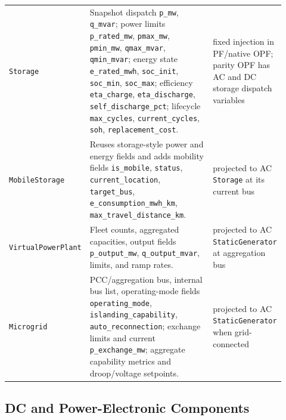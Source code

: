\begin{longtable}{L{0.20\linewidth}L{0.53\linewidth}L{0.19\linewidth}}
\texttt{Storage} & Snapshot dispatch \texttt{p\_mw}, \texttt{q\_mvar}; power limits \texttt{p\_rated\_mw}, \texttt{pmax\_mw}, \texttt{pmin\_mw}, \texttt{qmax\_mvar}, \texttt{qmin\_mvar}; energy state \texttt{e\_rated\_mwh}, \texttt{soc\_init}, \texttt{soc\_min}, \texttt{soc\_max}; efficiency \texttt{eta\_charge}, \texttt{eta\_discharge}, \texttt{self\_discharge\_pct}; lifecycle \texttt{max\_cycles}, \texttt{current\_cycles}, \texttt{soh}, \texttt{replacement\_cost}. & fixed injection in PF/native OPF; parity OPF has AC and DC storage dispatch variables \\
\texttt{MobileStorage} & Reuses storage-style power and energy fields and adds mobility fields \texttt{is\_mobile}, \texttt{status}, \texttt{current\_location}, \texttt{target\_bus}, \texttt{e\_consumption\_mwh\_km}, \texttt{max\_travel\_distance\_km}. & projected to AC \texttt{Storage} at its current bus \\
\texttt{VirtualPowerPlant} & Fleet counts, aggregated capacities, output fields \texttt{p\_output\_mw}, \texttt{q\_output\_mvar}, limits, and ramp rates. & projected to AC \texttt{StaticGenerator} at aggregation bus \\
\texttt{Microgrid} & PCC/aggregation bus, internal bus list, operating-mode fields \texttt{operating\_mode}, \texttt{islanding\_capability}, \texttt{auto\_reconnection}; exchange limits and current \texttt{p\_exchange\_mw}; aggregate capability metrics and droop/voltage setpoints. & projected to AC \texttt{StaticGenerator} when grid-connected \\
\bottomrule
\end{longtable}

\subsection{DC and Power-Electronic Components}

